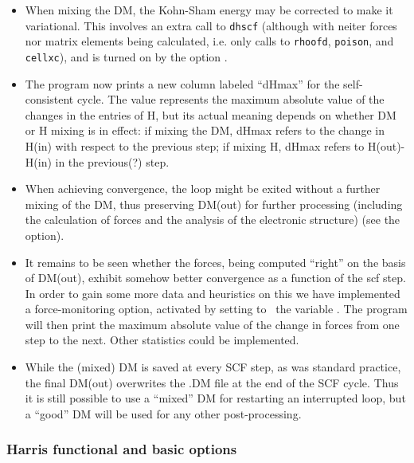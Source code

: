 \begin{itemize}
\item When mixing the DM, the Kohn-Sham energy may be corrected to make it
  variational. This involves an extra call to \texttt{dhscf} (although
  with neiter forces nor matrix elements being calculated, i.e. only
  calls to \texttt{rhoofd}, \texttt{poison}, and \texttt{cellxc}), and is
  turned on by the option .


\item The program now prints a new column labeled ``dHmax'' for the
  self-consistent cycle. The value represents the maximum absolute
  value of the changes in the entries of H, but its actual meaning
  depends on whether DM or H mixing is in effect: if mixing the DM,
  dHmax refers to the change in H(in) with respect to the previous
  step; if mixing H, dHmax refers to H(out)-H(in) in the previous(?)
  step.

  \item When achieving convergence, the loop might be exited without a
  further mixing of the DM, thus preserving DM(out) for further
  processing (including the calculation of forces and the analysis of
  the electronic structure) (see the 
  option).


  \item It remains to be seen whether the forces, being computed
  ``right'' on the basis of DM(out), exhibit somehow better
  convergence as a function of the scf step. In order to gain some
  more data and heuristics on this we have implemented a
  force-monitoring option, activated by setting to \fdftrue\ the
  variable . The program will then print the
  maximum absolute value of the change in forces from one step to the
  next. Other statistics could be implemented.

  \item While the (mixed) DM is saved at every SCF step, as was
  standard practice, the final DM(out) overwrites the .DM file at the
  end of the SCF cycle. Thus it is still possible to use a ``mixed''
  DM for restarting an interrupted loop, but a ``good'' DM will be
  used for any other post-processing.

\end{itemize}


\subsubsection{Harris functional and basic options}

